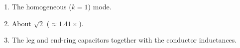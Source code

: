 \begin{enumerate}[leftmargin=1.6em,itemsep=2pt]
\item The homogeneous ($k = 1$) mode.
\item About $\sqrt{2}$ ($\approx1.41\times$).
\item The leg and end-ring capacitors together with the conductor inductances.
\end{enumerate}
